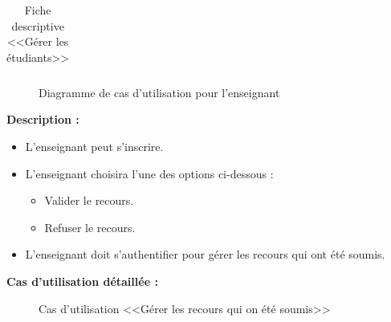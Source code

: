 \documentclass[12pt]{report}
\begin{document}
\begin{table}[h]
\begin{tabular}{|c|l|}
\end{tabular}
    \caption{Fiche descriptive <<Gérer les étudiants>>}
\end{table}

\begin{figure}[H]
\centering
  \vspace{-0.1in}
    \centerline{}
    \caption{Diagramme de cas d'utilisation pour l'enseignant}
  \vspace*{-0.3in}
\end{figure}

\newpage

\vspace{0.1in}

\textbf{Description :}

\begin{itemize}
    \item L'enseignant peut s'inscrire.
    \item L'enseignant choisira l'une des options ci-dessous :
    \begin{itemize}
        \item Valider le recours.
        \item Refuser le recours.
    \end{itemize}
    \item L'enseignant doit s'authentifier pour gérer les recours qui ont été soumis.
\end{itemize}

\vspace{0.2in}

\textbf{Cas d'utilisation détaillée :}

\vspace{0.2in}

\begin{figure}[h]
\centering
    \centerline{}
    \caption{Cas d'utilisation <<Gérer les recours qui on été soumis>>}
\end{figure}
\end{document}
